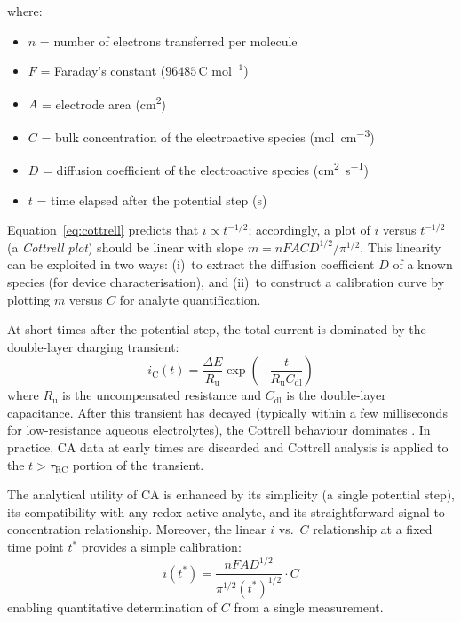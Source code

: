 where:
\begin{itemize}
    \item $n$ = number of electrons transferred per molecule
    \item $F$ = Faraday's constant ($96485\,\text{C mol}^{-1}$)
    \item $A$ = electrode area (\si{\centi\metre\squared})
    \item $C$ = bulk concentration of the electroactive species (\si{\mol\per\centi\metre\cubed})
    \item $D$ = diffusion coefficient of the electroactive species (\si{\centi\metre\squared\per\second})
    \item $t$ = time elapsed after the potential step (\si{\second})
\end{itemize}

Equation~\ref{eq:cottrell} predicts that $i \propto t^{-1/2}$; accordingly, a plot of $i$ versus $t^{-1/2}$ (a \textit{Cottrell plot}) should be linear with slope $m = nFACD^{1/2}/\pi^{1/2}$. This linearity can be exploited in two ways: (i)~to extract the diffusion coefficient $D$ of a known species (for device characterisation), and (ii)~to construct a calibration curve by plotting $m$ versus $C$ for analyte quantification.

At short times after the potential step, the total current is dominated by the double-layer charging transient:
\begin{equation}
    i_\mathrm{C}(t) = \frac{\Delta E}{R_\mathrm{u}} \exp\!\left(-\frac{t}{R_\mathrm{u} C_\mathrm{dl}}\right)
\end{equation}
where $R_\mathrm{u}$ is the uncompensated resistance and $C_\mathrm{dl}$ is the double-layer capacitance. After this transient has decayed (typically within a few milliseconds for low-resistance aqueous electrolytes), the Cottrell behaviour dominates \cite{Bard2001}. In practice, CA data at early times are discarded and Cottrell analysis is applied to the $t > \tau_\mathrm{RC}$ portion of the transient.

The analytical utility of CA is enhanced by its simplicity (a single potential step), its compatibility with any redox-active analyte, and its straightforward signal-to-concentration relationship. Moreover, the linear $i$ vs.\ $C$ relationship at a fixed time point $t^*$ provides a simple calibration:
\begin{equation}
    i(t^*) = \frac{nFAD^{1/2}}{\pi^{1/2} (t^*)^{1/2}} \cdot C
\end{equation}
enabling quantitative determination of $C$ from a single measurement.

